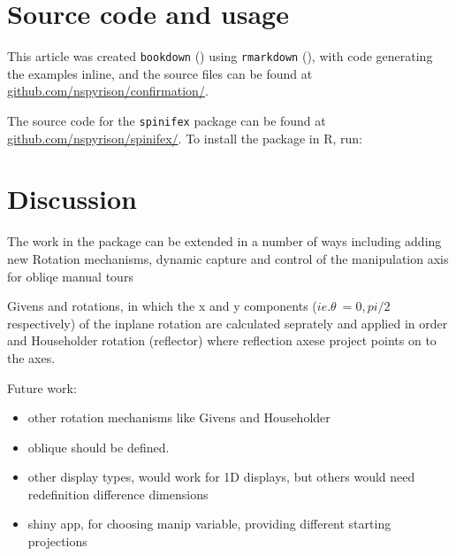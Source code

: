 \documentclass{monashthesis}
\begin{document}
\section{Source code and usage}\label{source-code-and-usage}

This article was created \texttt{bookdown}
(\textcite{xie_bookdown:_2016}) using \texttt{rmarkdown}
(\textcite{xie_r_2018}), with code generating the examples inline, and
the source files can be found at
\href{https://github.com/nspyrison/confirmation/}{github.com/nspyrison/confirmation/}.

The source code for the \texttt{spinifex} package can be found at
\href{https://github.com/nspyrison/spinifex/}{github.com/nspyrison/spinifex/}.
To install the package in R, run:

\begin{Shaded}
\begin{Highlighting}[]
\OperatorTok{::}\NormalTok{(}\NormalTok{)}
\end{Highlighting}
\end{Shaded}

\section{Discussion}\label{discussion}

The work in the package can be extended in a number of ways including
adding new Rotation mechanisms, dynamic capture and control of the
manipulation axis for obliqe manual tours

Givens and rotations, in which the x and y components
(\(ie. \theta~= 0,pi/2\) respectively) of the inplane rotation are
calculated seprately and applied in order and Householder rotation
(reflector) where reflection axese project points on to the axes.

Future work:

\begin{itemize}
\tightlist
\item
  other rotation mechanisms like Givens and Householder
\item
  oblique should be defined.
\item
  other display types, would work for 1D displays, but others would need
  redefinition difference dimensions
\item
  shiny app, for choosing manip variable, providing different starting
  projections
\end{itemize}
\end{document}
